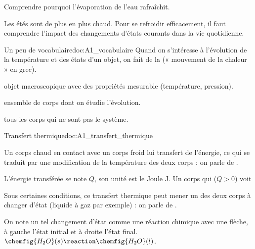 \teteSndTran

\vspace*{-40pt}

\begin{objectifs}
  \item Comprendre pourquoi l'évaporation de l'eau rafraîchit.
\end{objectifs}

\begin{contexte}
  Les étés sont de plus en plus chaud. Pour se refroidir efficacement, il faut comprendre l'impact des changements d'états courants dans la vie quotidienne.
  
\end{contexte}


\begin{doc}{Un peu de vocabulaire}{doc:A1_vocabulaire}
  Quand on s'intéresse à l'évolution de la température et des états d'un objet, on fait de la  (« mouvement de la chaleur » en grec).
  
  \begin{encart}
    \begin{listePoints}
      \item {} objet macroscopique avec des propriétés mesurable (température, pression).
      \item {} ensemble de corps dont on étudie l'évolution.
      \item {} tous les corps qui ne sont pas le système.
    \end{listePoints}
  \end{encart}
\end{doc}

\begin{doc}{Transfert thermique}{doc:A1_transfert_thermique}
  \begin{encart}
    Un corps chaud en contact avec un corps froid lui transfert de l'énergie, ce qui se traduit par une modification de la température des deux corps : on parle de .
  \end{encart}
  L'énergie transférée se note $Q$, son unité est le Joule \unit{\joule}.
  Un corps qui  ($Q > 0$) voit 
  
  
  \begin{encart}
    Sous certaines conditions, ce transfert thermique peut mener un des deux corps à changer d'état (liquide à gaz par exemple) : on parle de .
  \end{encart}
  On note un tel changement d'état comme une réaction chimique avec une flèche, à gauche l'état initial et à droite l'état final.
  \exemple $\chemfig{H_2O}(s) \reaction \chemfig{H_2O}(l)$.
\end{doc}

